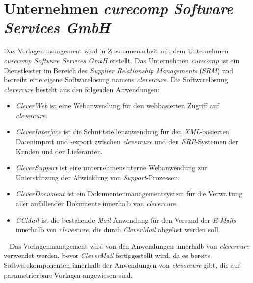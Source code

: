 \section{Unternehmen \emph{curecomp Software Services GmbH}}
Das Vorlagenmanagement wird in Zusammenarbeit mit dem Unternehmen \emph{curecomp Software Services GmbH} erstellt. Das Unternehmen \emph{curecomp} ist ein Dienstleister im Bereich des \emph{Supplier Relationship Managements} (\emph{SRM}) und betreibt eine eigene Softwarelösung namens \emph{clevercure}. Die Softwarelösung \emph{clevercure} besteht aus den folgenden Anwendungen:
\newline
\begin{itemize}
	\item\emph{CleverWeb} ist eine Webanwendung für den webbasierten Zugriff auf \emph{clevercure}.
	\item\emph{CleverInterface} ist die Schnittstellenanwendung für den \emph{XML}-basierten Datenimport und -export zwischen \emph{clevercure} und den \emph{ERP}-Systemen der Kunden und der Lieferanten.
	\item\emph{CleverSupport} ist eine unternehmensinterne Webanwendung zur Unterstützung der Abwicklung von \emph{Support}-Prozessen.
	\item\emph{CleverDocument} ist ein Dokumentenmanagementsystem für die Verwaltung aller anfallender Dokumente innerhalb von \emph{clevercure}.
	\item\emph{CCMail} ist die bestehende \emph{Mail}-Anwendung für den Versand der \emph{E-Mails} innerhalb von \emph{clevercure}, die durch \emph{CleverMail} abgelöst werden soll.
\end{itemize}
\ \newline
Das Vorlagenmanagement wird von den Anwendungen innerhalb von \emph{clevercure} verwendet werden, bevor \emph{CleverMail} fertiggestellt wird, da es bereits Softwarekomponenten innerhalb der Anwendungen von \emph{clevercure} gibt, die auf parametrierbare Vorlagen angewiesen sind.


